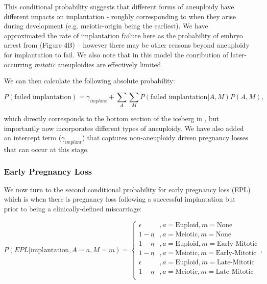 \documentclass{article}
\begin{document}
This conditional probability suggests that different forms of aneuploidy have different impacts on implantation - roughly corresponding to when they arise during development (e.g. meiotic-origin being the earliest).  We have approximated the rate of implantation failure here as the probability of embryo arrest from \citep{McCoy2023-dg} (Figure 4B) -- however there may be other reasons beyond aneuploidy for implantation to fail. We also note that in this model the conribution of later-occurring \textit{mitotic} aneuploidies are effectively limited.   

We can then calculate the following absolute probability:

\begin{equation}
P(\text{failed implantation}) = \gamma_{implant} + \sum_{A}\sum_{M} P(\text{failed implantation} | A, M) P(A, M) ,
\end{equation}

which directly corresponds to the bottom section of the iceberg in \citep{Macklon2002-zn}, but importantly now incorporates different types of aneuploidy. We have also added an intercept term ($\gamma_{implant}$) that captures non-aneuploidy driven pregnancy losses that can occur at this stage.   

\subsubsection*{Early Pregnancy Loss}

We now turn to the second conditional probability for early pregnancy loss (EPL) which is when there is pregnancy loss following a successful implantation but prior to being a clinically-defined miscarriage:

\begin{equation}
	P(EPL | \text{implantation}, A=a, M=m) = \begin{cases}
	\epsilon &, a= \text{Euploid}, m=\text{None}\\
	1 - \eta &, a = \text{Meiotic}, m=\text{None}\\
	1 - \eta &, a = \text{Euploid}, m=\text{Early-Mitotic}\\
	1 - \eta &, a = \text{Meiotic}, m=\text{Early-Mitotic}\\
	\epsilon &, a = \text{Euploid}, m=\text{Late-Mitotic}\\
	1 - \eta &, a = \text{Meiotic}, m=\text{Late-Mitotic}\\
	\end{cases},
\end{equation}
\end{document}
